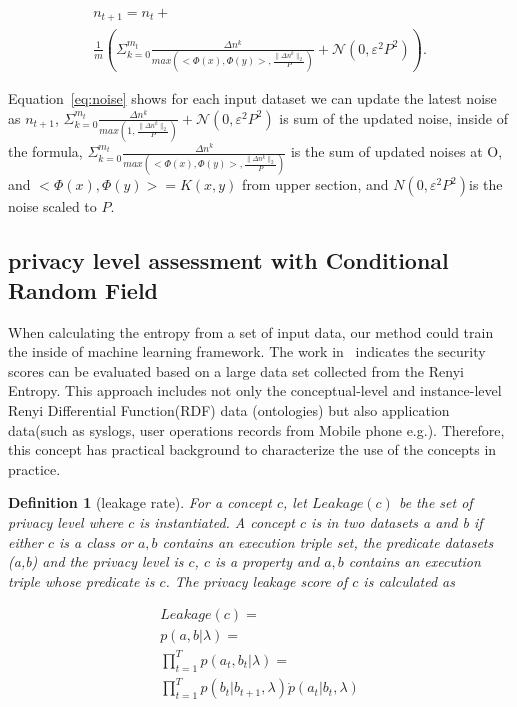 \documentclass[journal,transmag]{IEEEtran}
\newtheorem{definition}{Definition}
\begin{document}
\begin{equation}\label{eq:noise}
\begin{array}{cc}
n_{t+1}= n_t + \\
\frac{1}{m}(\Sigma_{k=0}^{m_t} \frac{\Delta n^k}{max(<\Phi(x),\Phi(y)>,\frac{\|\Delta n^k \|_2}{P})}+\mathcal{N}(0,\varepsilon^2 P^2)).
\end{array}
\end{equation}

Equation~\eqref{eq:noise} shows for each input dataset we can update the latest noise as $n_{t+1}$,  $ \Sigma_{k=0}^{m_t} \frac{\Delta n^k}{max(1,\frac{\|\Delta n^k \|_2}{P})} +\mathcal{N}(0,\varepsilon^2 P^2) $ is sum of the updated noise, inside of the formula, $\Sigma_{k=0}^{m_t} \frac{\Delta n^k}{max(<\Phi(x),\Phi(y)>,\frac{\|\Delta n^k \|_2}{P}) }$ is the sum of updated noises at O, and $<\Phi(x),\Phi(y)>=K(x,y)$ from upper section, and  $N(0,\varepsilon^2 P^2)$is the noise scaled to $P$. 

\subsection{privacy level assessment with Conditional Random Field}

When calculating the entropy from a set of input data, our method could train the inside of machine learning framework. The work in~\cite{qu2011falcons} indicates the security scores can be evaluated based on a large data set collected from the Renyi Entropy. This approach includes not only the conceptual-level and instance-level Renyi Differential Function(RDF) data (ontologies) but also application data(such as syslogs, user operations records from Mobile phone e.g.). Therefore, this concept has practical background to characterize the use of the concepts in practice.

\begin{definition}[leakage rate] \label{def:leakage} 
For a concept $c$, let $Leakage(c)$ be the set of privacy level where $c$ is instantiated. A concept $c$ is in two datasets a and b if either $c$ is a class or $a,b$ contains an execution triple set, the predicate datasets (a,b) and the privacy level is $c$,  $c$ is a property and $a,b$ contains an execution triple whose predicate is $c$. The privacy leakage score of $c$ is calculated as

\begin{equation}\label{eq:ranking}
\begin{array}{ll}
    Leakage(c)=\\
    p(a,b|\lambda) =\\
    \prod^T_{t=1} p(a_t,b_t|\lambda)= \\
     \prod^T_{t=1} p(b_t|b_{t+1},\lambda)\dot p(a_t|b_t,\lambda) 

\end{array}
\end{equation}
\end{definition}
\end{document}
